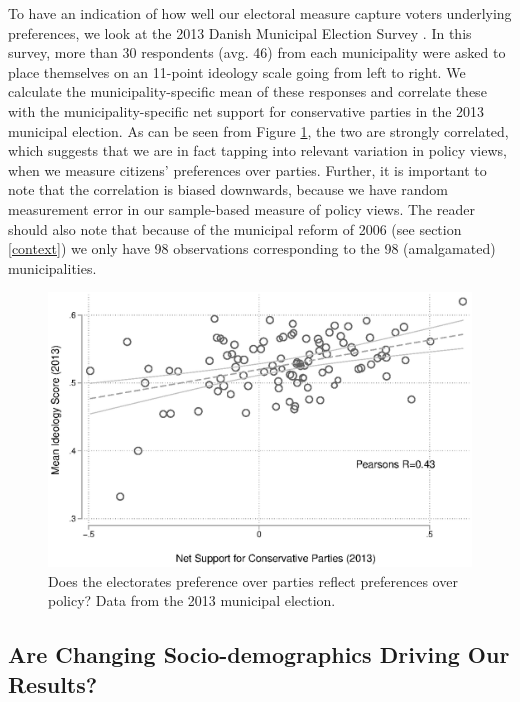 \documentclass[a4paper,12pt]{article}
\begin{document}
\setcounter{table}{0}
\setcounter{figure}{0}


To have an indication of how well our electoral measure capture voters underlying preferences, we look at the 2013 Danish Municipal Election Survey \cite{elklit2017kv13}. In this survey, more than 30 respondents (avg. 46) from each municipality were asked to place themselves on an 11-point ideology scale going from left to right. We calculate the municipality-specific mean of these responses and correlate these with the municipality-specific net support for conservative parties in the 2013 municipal election.  As can be seen from Figure \ref{validation1}, the two are strongly correlated, which suggests that we are in fact tapping into relevant variation in policy views, when we measure citizens' preferences over parties. Further, it is important to note that the correlation is biased downwards, because we have random measurement error in our sample-based measure of policy views. The reader should also note that because of the municipal reform of 2006 (see section \ref{context})  we only have 98 observations corresponding to the 98 (amalgamated) municipalities.




\begin{figure}[htbp]
	\includegraphics[width=1\textwidth]{validation1.eps}
	\caption{Does the electorates preference over parties reflect preferences over policy? Data from the 2013 municipal election.} \label{validation1}
\end{figure}  
\clearpage


\subsection{Are Changing Socio-demographics Driving Our Results?}\label{balance}
\end{document}
